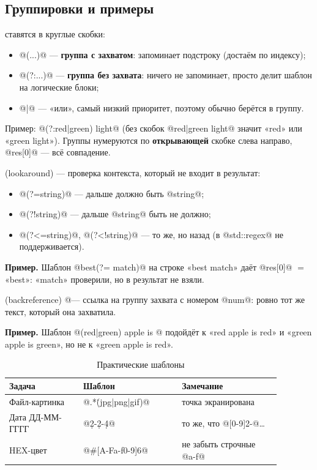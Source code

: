 \documentclass[11pt,a4paper]{article}
\begin{document}
\subsection{Группировки и примеры}

\begin{opr}
 ставятся в круглые скобки:
\begin{itemize}
\item @(...)@ — \textbf{группа с захватом}: запоминает подстроку (достаём по индексу);
\item @(?:...)@ — \textbf{группа без захвата}: ничего не запоминает, просто делит шаблон на логические блоки;
\item @|@ — «или», самый низкий приоритет, поэтому обычно берётся в группу.
\end{itemize}
Пример: @(?:red|green) light@ (без скобок @red|green light@ значит «red» или «green light»).
Группы нумеруются по \textbf{открывающей} скобке слева направо, @res[0]@ — всё совпадение.
\end{opr}

\begin{opr}
 (lookaround) — проверка контекста, который не входит в результат:
\begin{itemize}
\item @(?=string)@ — дальше должно быть @string@;
\item @(?!string)@ — дальше @string@ быть не должно;
\item @(?<=string)@, @(?<!string)@ — то же, но назад (в @std::regex@ не поддерживается).
\end{itemize}
\end{opr}

\textbf{Пример.} Шаблон @best(?= match)@ на строке «best match» даёт @res[0]@ $=$ «best»: «match» проверили, но в результат не взяли.

\begin{opr}
 (backreference) @\num@ — ссылка на группу захвата с номером @num@: ровно тот же текст, который она захватила.
\end{opr}

\textbf{Пример.} Шаблон @(red|green) apple is \1@ подойдёт к «red apple is red» и «green apple is green», но не к «green apple is red».

\begin{table}[H]
\centering
\renewcommand{\arraystretch}{1.4}
\begin{tabular}{p{0.24\linewidth}p{0.32\linewidth}p{0.32\linewidth}}
\toprule
{\hfont\color{kviolet}Задача} & {\hfont\color{kviolet}Шаблон} & {\hfont\color{kviolet}Замечание}\\
\midrule
Файл-картинка & @.*\.(jpg|png|gif)@ & точка экранирована\\
Дата ДД-ММ-ГГГГ & @\d{2}-\d{2}-\d{4}@ & то же, что @[0-9]{2}-@\ldots\\
HEX-цвет & @#[A-Fa-f0-9]{6}@ & не забыть строчные @a-f@\\
\bottomrule
\end{tabular}
\caption{Практические шаблоны}
\end{table}
\end{document}
